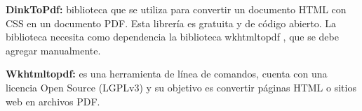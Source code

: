 \textbf{DinkToPdf: } biblioteca que se utiliza para convertir un documento HTML con CSS en un documento PDF. Esta librería es gratuita y de código abierto. La biblioteca necesita como dependencia la biblioteca wkhtmltopdf , que se debe agregar manualmente.

\textbf{Wkhtmltopdf: } es una herramienta de línea de comandos, cuenta con una licencia Open Source (LGPLv3) y su objetivo es convertir páginas HTML o sitios web en archivos PDF.